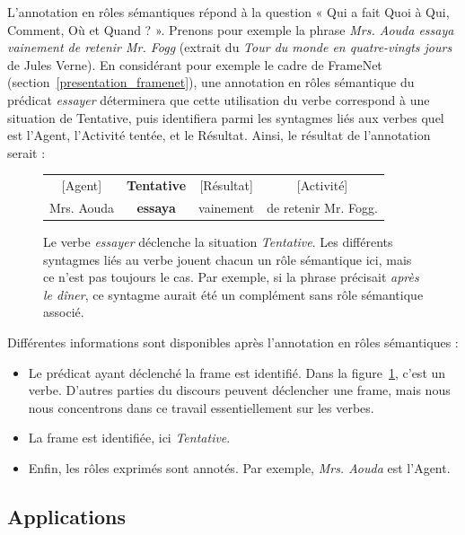 L'annotation en rôles sémantiques répond à la question « Qui a fait Quoi à Qui,
Comment, Où et Quand ? ». Prenons pour exemple la phrase \emph{Mrs. Aouda
essaya vainement de retenir Mr. Fogg} (extrait du \emph{Tour du monde en
quatre-vingts jours} de Jules Verne).  En considérant pour exemple le cadre de
FrameNet (section~\ref{presentation_framenet}), une annotation en rôles
sémantique du prédicat \emph{essayer} déterminera que cette utilisation du
verbe correspond à une situation de Tentative, puis identifiera parmi les
syntagmes liés aux verbes quel est l'Agent, l'Activité tentée, et le Résultat.
Ainsi, le résultat de l'annotation serait :

\begin{figure}[ht]
    \centering
    \begin{tabular}{cccc}
    [Agent]  & \textbf{Tentative} & [Résultat]  & [Activité]         \tabularnewline
    Mrs. Aouda & \textbf{essaya}  & vainement & de retenir Mr. Fogg. \tabularnewline
    \end{tabular}
    \caption{\label{fig:introsrl}Le verbe \emph{essayer} déclenche la situation
        \emph{Tentative}. Les différents syntagmes liés au verbe jouent chacun
        un rôle sémantique ici, mais ce n'est pas toujours le cas. Par exemple,
        si la phrase précisait \emph{après le dîner}, ce syntagme aurait été un
    complément sans rôle sémantique associé.}

\end{figure}

Différentes informations sont disponibles après l'annotation en rôles
sémantiques :

\begin{itemize}
    \item Le prédicat ayant déclenché la frame est identifié. Dans la
        figure~\ref{fig:introsrl}, c'est un verbe. D'autres parties du
        discours peuvent déclencher une frame, mais nous nous concentrons dans
        ce travail essentiellement sur les verbes.
    \item La frame est identifiée, ici \emph{Tentative}.
    \item Enfin, les rôles exprimés sont annotés. Par exemple, \emph{Mrs.
        Aouda} est l'Agent.
\end{itemize}

\subsection{Applications}

